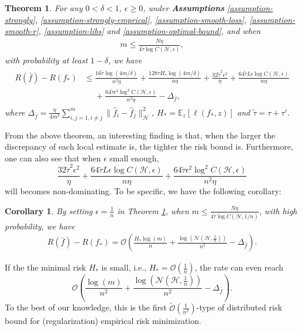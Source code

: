 \documentclass{article}
\newtheorem{theorem}{Theorem}
\newtheorem{corollary}{Corollary}
\begin{document}
\begin{theorem}
\label{theorem-main}
For any $0<\delta<1$, $\epsilon\geq 0$,
under \textbf{Assumptions}  \ref{assumption-strongly}, \ref{assumption-strongly-emprical},
\ref{assumption-smooth-loss}, \ref{assumption-smooth-r}, \ref{assumption-libs} and \ref{assumption-optimal-bound},
and when
  \begin{align}
    \label{equation-12}
    m\leq \frac{N\eta}{4\tilde{\tau}\log C(\mathcal{H},\epsilon)},
  \end{align}
  with probability at least $1-\delta$,
  we have
  \begin{align}
    \label{equation-13}
    \begin{aligned}
    R(\bar{f})-R(f_\ast)&\leq
    \frac{16\tilde{\tau} \log(4m/\delta)}{n^2\eta}+\frac{128\tau H_\ast\log(4m/\delta)}{n\eta}+\frac{32\tilde{\tau}^2\epsilon^2}{\eta}+
    \frac{64\tilde{\tau} L \epsilon \log C(\mathcal{H},\epsilon)}{n\eta}\\
   &~~~~~~+\frac{64\tilde{\tau} \epsilon^2 \log^2C(\mathcal{H},\epsilon)}{n^2\eta}
   -\Delta_{\bar{f}},
  \end{aligned}
  \end{align}
  where $\Delta_{\bar{f}}=\frac{\eta}{4m^2}\sum_{i,j=1,i\not=j}^m\|\hat{f}_i-\hat{f}_j\|_\mathcal{H}^2$, $H_\ast=\mathbb{E}_{z}\left[\ell(f_\ast,z)\right]$ and $\tilde{\tau}=\tau+\tau'$.
\end{theorem}
From the above theorem, an  interesting finding is that,
when the larger the discrepancy of each local estimate is,
the tighter the risk bound is.
Furthermore, one can also see that when $\epsilon$ small enough,
$$\frac{32\tilde{\tau}^2\epsilon^2}{\eta}+
    \frac{64\tilde{\tau} L \epsilon \log C(\mathcal{H},\epsilon)}{n\eta}
    +\frac{64\tilde{\tau} \epsilon^2\log^2C(\mathcal{H},\epsilon)}{n^2\eta}$$
will becomes non-dominating.
To be specific, we have the following corollary:
\begin{corollary}
\label{corollary-first}
  By setting $\epsilon=\frac{1}{n}$ in Theorem \ref{theorem-main},
  when $m\leq \frac{N\eta}{4\tilde{\tau}\log C(\mathcal{H},1/n)}$,
  with high probability,
  we have
  \begin{align*}
    R(\bar{f})-R(f_\ast)=\mathcal{O}\left(\frac{H_\ast\log(m)}{n}
    +\frac{\log(\mathcal{N}(\mathcal{H},\frac{1}{n}))}{n^2}
    -\Delta_{\bar{f}}\right).
  \end{align*}
\end{corollary}
If the the minimal risk $H_\ast$ is small, i.e., $H_\ast=\mathcal{O}(\frac{1}{n})$,
the rate can even reach $$\mathcal{O}\left(\frac{\log(m)}{n^2}
    +\frac{\log(\mathcal{N}(\mathcal{H},\frac{1}{n}))}{n^2}
    -\Delta_{\bar{f}}\right).$$
To the best of our knowledge,
this is the first $\tilde{\mathcal{O}}\left(\frac{1}{n^2}\right)$-type of distributed
risk bound for (regularization) empirical risk minimization.
\end{document}
